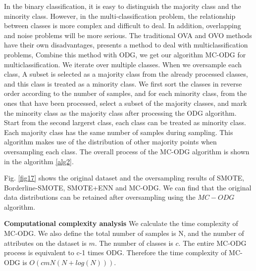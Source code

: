 \documentclass[ida]{iosart2x}
\begin{document}
 In the binary classification, 
it is easy to distinguish the majority class and the minority class. 
However, in the multi-classification problem, the relationship between
classes is more complex and difficult to deal.
In addition, overlapping and noise problems will be more serious.
The traditional OVA and OVO methods have their own disadvantages,  
\cite{2020Combined,2019Radial} presents a method to deal with multiclassification problems,
Combine this method with ODG, we get our algorithm MC-ODG for multiclassification.
We iterate over multiple classes. When we oversample each class,
A subset is selected as a majority class from the already processed classes, 
and this class is treated as a minority class.
We first sort the classes in reverse order according to the number of samples, and for each minority class, 
from the ones that have been processed,
select a subset of the majority classes, and mark the minority class as the majority class 
after processing the ODG algorithm.
Start from the second largerst class, each class can be treated as minority class.
Each majority class has the same number of samples during sampling.
This algorithm makes use of the distribution of 
other majority points when oversampling each class.
The overall process of the MC-ODG algorithm is shown in the algorithm \ref{alg2}.


 Fig. \ref{fig17} shows the original dataset and the oversampling results of SMOTE, Borderline-SMOTE,
 SMOTE+ENN and MC-ODG. We can find that the original data distributions 
 can be retained after oversampling using the $MC-ODG$ algorithm.

 \textbf{Computational complexity analysis}
We calculate the time complexity of MC-ODG.
 We also define the total number of samples is N, and the number of attributes on the dataset is $m$.
 The number of classes is $c$. The entire MC-ODG process is equivalent to c-1 times ODG.
 Therefore the time complexity of MC-ODG is $O(cmN(N+log(N)))$.
\end{document}
